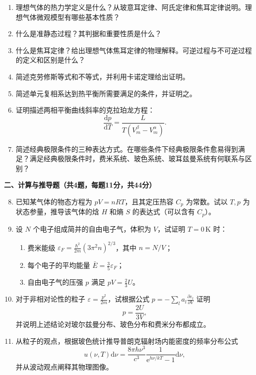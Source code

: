\documentclass[12pt,a4paper,fontset=mac]{ctexart}
\newcommand{\ee}{\mathrm{e}}
\newcommand{\dd}{\mathrm{d}}
\newcommand{\đ}{\mathrm{đ}}
\newcommand{\shortanswer}{\vspace{5.5cm}}
\newcommand{\calcanswer}{\vspace{8.5cm}}
\begin{document}
\begin{enumerate}
\item 理想气体的热力学定义是什么？从玻意耳定律、阿氏定律和焦耳定律说明。理想气体微观模型有哪些基本性质？
\shortanswer

\item 什么是准静态过程？其判据和重要性质是什么？
\shortanswer

\item 什么是焦耳定律？给出理想气体焦耳定律的物理解释。可逆过程与不可逆过程的定义和区别是什么？
\shortanswer

\item 简述克劳修斯等式和不等式，并利用卡诺定理给出证明。
\shortanswer

\item 简述单元复相系达到热平衡所需要满足的条件，并证明之。
\shortanswer

\item 证明描述两相平衡曲线斜率的克拉珀龙方程：
\[
\frac{\dd p}{\dd T} = \frac{L}{T(V_m^\beta - V_m^\alpha)} .
\]
\shortanswer

\item 简述经典极限条件的三种表达方式。在哪些条件下经典极限条件愈易得到满足？满足经典极限条件时，费米系统、玻色系统、玻耳兹曼系统有何联系与区别？
\shortanswer

\end{enumerate}

\newpage

\noindent\textbf{二、计算与推导题（共4题，每题11分，共44分）}

\begin{enumerate}
\setcounter{enumi}{7}
\item 已知某气体的物态方程为 $pV = nRT$，且其定压热容 $C_p$ 为常数。试以 $T,p$ 为状态参量，推导该气体的焓 $H$ 和熵 $S$ 的表达式（可以含有 $C_p$）。
\calcanswer

\item 设 $N$ 个电子组成简并的自由电子气，体积为 $V$，试证明 $T = 0\,\text{K}$ 时：
\begin{enumerate}
\item 费米能级 $\varepsilon_F = \frac{\hbar^2}{2m}(3\pi^2 n)^{2/3}$，其中 $n = N/V$；
\item 每个电子的平均能量 $\bar{E} = \frac{3}{5}\varepsilon_F$；
\item 自由电子气的压强 $p$ 满足 $pV = \frac{2}{3}U$。
\end{enumerate}
\calcanswer

\item 对于非相对论性的粒子 $\varepsilon = \frac{p^2}{2m}$，试根据公式 $p = -\sum_l a_l \frac{\partial\varepsilon_l}{\partial V}$ 证明
\[
p = \frac{2U}{3V},
\]
并说明上述结论对玻尔兹曼分布、玻色分布和费米分布都成立。
\calcanswer

\item 从粒子的观点，根据玻色统计推导普朗克辐射场内能密度的频率分布公式
\[
u(\nu,T)\dd\nu = \frac{8\pi h\nu^3}{c^3}\frac{1}{\ee^{h\nu/kT} - 1}\dd\nu ,
\]
并从波动观点阐释其物理图像。
\calcanswer

\end{enumerate}
\end{document}
